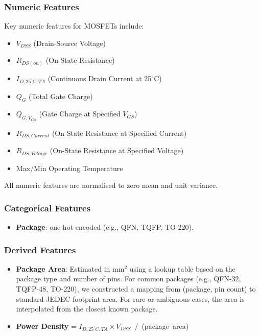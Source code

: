 \subsubsection{Numeric Features}
Key numeric features for MOSFETs include:
\begin{itemize}
  \item $V_{DSS}$ (Drain-Source Voltage)
  \item $R_{DS(on)}$ (On-State Resistance)
  \item $I_{D,25^\circ C,TA}$ (Continuous Drain Current at 25$^\circ$C)
  \item $Q_G$ (Total Gate Charge)
  \item $Q_{G,V_{GS}}$ (Gate Charge at Specified $V_{GS}$)
  \item $R_{DS,Current}$ (On-State Resistance at Specified Current)
  \item $R_{DS,Voltage}$ (On-State Resistance at Specified Voltage)
  \item Max/Min Operating Temperature
\end{itemize}
All numeric features are normalised to zero mean and unit variance.

\subsubsection{Categorical Features}
\begin{itemize}
  \item \textbf{Package}: one-hot encoded (e.g., QFN, TQFP, TO-220).
\end{itemize}

\subsubsection{Derived Features}
\begin{itemize}
  \item \textbf{Package Area}: Estimated in mm$^2$ using a lookup table based on the package type and number of pins. For common packages (e.g., QFN-32, TQFP-48, TO-220), we constructed a mapping from (package, pin count) to standard JEDEC footprint area. For rare or ambiguous cases, the area is interpolated from the closest known package.
  \item \textbf{Power Density} = $I_{D,25^\circ C,TA} \times V_{DSS}$~\slash~(package~area)
\end{itemize}

